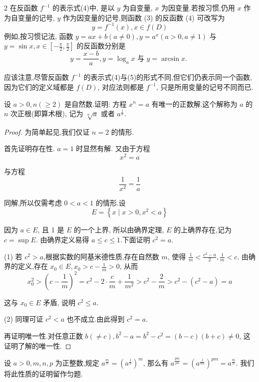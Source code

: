 \begin{remark}
	2 在反函数 $f^{-1}$ 的表示式(4)中, 是以 $y$ 为自变量, $x$ 为因变量.若按习惯,仍用 $x$ 作为自变量的记号, $y$ 作为因变量的记号,则函数 (3) 的反函数 (4) 可改写为
	\[
	y=f^{-1}(x), x \in f(D) \tag{5}
	\]
例如,按习惯记法, 函数 $y=a x+b(a \neq 0), y=a^{x}(a>0, a \neq 1)$ 与 $y=\sin x, x \in\left[-\frac{\pi}{2}, \frac{\pi}{2}\right]$ 的反函数分别是
	\[
	y=\frac{x-b}{a}, y=\log _{a} x \text { 与 } y=\arcsin x \text {. }
	\]
\end{remark}


应该注意,尽管反函数 $f^{-1}$ 的表示式(4)与(5)的形式不同,但它们仍表示同一个函数, 因为它们的定义域都是 $f(D)$, 对应法则都是 $f^{-1}$, 只是所用变量的记号不同而已.

\begin{example}
	设 $a>0, n(\geqslant 2)$ 是自然数.证明: 方程 $x^{n}=a$ 有唯一的正数解.这个解称为 $a$ 的 $n$ 次正根(即算术根), 记为 $\sqrt[n]{a}$ 或者 $a^{\frac{1}{n}}$.
\end{example}

\begin{proof}
	为简单起见,我们仅证 $n=2$ 的情形.

	首先证明存在性. $a=1$ 时显然有解. 又由于方程
	\[
	x^{2}=a
	\]

	与方程
	\[
	\frac{1}{x^{2}}=\frac{1}{a}
	\]

	同解,所以仅需考虑 $0<a<1$ 的情形.设
	\[
	E=\left\{x \mid x>0, x^{2}<a\right\}
	\]

	因为 $a \in E$, 且 1 是 $E$ 的一个上界, 所以由确界定理, $E$ 的上确界存在,记为 $c=\sup E$. 由确界定义易得 $a \leqslant c \leqslant 1$.下面证明 $c^{2}=a$.

	(1) 若 $c^{2}>a$,根据实数的阿基米德性质,存在自然数 $m$, 使得 $\frac{1}{m}<\frac{c^{2}-a}{2}, \frac{1}{m}<c$. 由确界的定义,存在 $x_{0} \in E, x_{0}>c-\frac{1}{m}>0$, 从而
	\[
	x_{0}^{2}>\left(c-\frac{1}{m}\right)^{2}=c^{2}-2 \cdot \frac{c}{m}+\frac{1}{m^{2}}>c^{2}-\frac{2}{m}>c^{2}-\left(c^{2}-a\right)=a
	\]

	这与 $x_{0} \in E$ 矛盾, 说明 $c^{2} \leqslant a$.

	(2) 同理可证 $c^{2}<a$ 也不成立.由此得到 $c^{2}=a$.

	再证明唯一性.对任意正数 $b(\neq c), b^{2}-a=b^{2}-c^{2}=(b-c)(b+c) \neq 0$, 这证明了解的唯一性.
\end{proof}


设 $a>0, m, n, p$ 为正整数,规定 $a^{\frac{m}{n}}=\left(a^{\frac{1}{n}}\right)^{m}$, 那么有 $a^{\frac{p m}{p n}}=\left(a^{\frac{1}{n n}}\right)^{p m}=a^{\frac{m}{n}}$. 我们将此性质的证明留作匀题.


